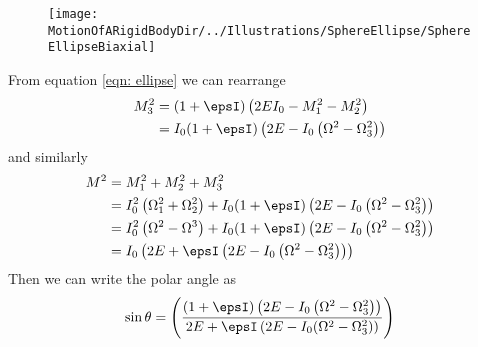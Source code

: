 \documentclass[/home/greg/Thesis/main/main.tex]{subfiles}
\begin{document}
\begin{figure}[htb]
\centering
\texttt{[image: \\MotionOfARigidBodyDir/../Illustrations/SphereEllipse/SphereEllipseBiaxial]}
\caption{}
\label{}
\end{figure}

From equation \eqref{eqn: ellipse} we can rearrange
\begin{align}
    M_{3}^{2} & = (1+\epsI)\left(2EI_{0} - M_{1}^{2} - M_{2}^{2}\right) \\
              & = I_{0} (1+\epsI)\left(2E - I_{0}\left(\Omega^{2} - \Omega_{3}^{2}\right)\right)
\end{align}
and similarly
\begin{align}
    M^{2} & = M_{1}^{2} + M_{2}^{2} + M_{3}^{2} \\
          & = I_{0}^{2}\left(\Omega_{1}^{2} + \Omega_{2}^{2}\right) 
    + I_{0}(1 + \epsI)\left(2E - I_{0}\left(\Omega^{2} - \Omega_{3}^{2}\right)\right)\\
          & = I_{0}^{2}\left(\Omega^{2} - \Omega^{3}\right)
    + I_{0}(1 + \epsI)\left(2E - I_{0}\left(\Omega^{2} - \Omega_{3}^{2}\right)\right)\\
    & = I_{0}\left(2E + \epsI \left(2E - I_{0}\left(\Omega^{2} - \Omega^{2}_{3}\right)\right)\right)
\end{align}
Then we can write the polar angle as
\begin{equation}
    \sin\theta = \left(\frac{(1+\epsI)\left(2E - I_{0}\left(\Omega^{2} - \Omega_{3}^{2}\right)\right)}
        {2E + \epsI\left(2E - I_{0}(\Omega^{2} - \Omega_{3}^{2})\right)}
    \right)
\end{equation}

\biblio
\end{document}
